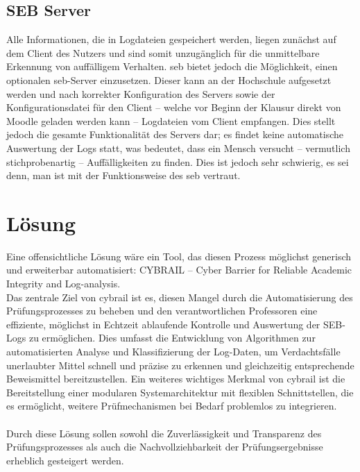 \subsection{SEB Server}
Alle Informationen, die in Logdateien gespeichert werden, liegen zunächst auf dem Client des Nutzers und sind somit unzugänglich für die unmittelbare Erkennung von auffälligem Verhalten. 
\gls{seb} bietet jedoch die Möglichkeit, einen optionalen \gls{seb}-Server einzusetzen. 
Dieser kann an der Hochschule aufgesetzt werden und nach korrekter Konfiguration des Servers sowie der Konfigurationsdatei für den Client – welche vor Beginn der Klausur direkt von Moodle geladen werden kann – Logdateien vom Client empfangen. 
Dies stellt jedoch die gesamte Funktionalität des Servers dar; 
es findet keine automatische Auswertung der Logs statt, was bedeutet, dass ein Mensch versucht – vermutlich stichprobenartig – Auffälligkeiten zu finden. 
Dies ist jedoch sehr schwierig, es sei denn, man ist mit der Funktionsweise des \gls{seb} vertraut.

\section{Lösung}
Eine offensichtliche Lösung wäre ein Tool, das diesen Prozess möglichst generisch und erweiterbar automatisiert: CYBRAIL – Cyber Barrier for Reliable Academic Integrity and Log-analysis.\\
Das zentrale Ziel von \gls{cybrail} ist es, diesen Mangel durch die Automatisierung des Prüfungsprozesses zu beheben und den verantwortlichen Professoren eine effiziente, möglichst in Echtzeit ablaufende Kontrolle und Auswertung der SEB-Logs zu ermöglichen. Dies umfasst die Entwicklung von Algorithmen zur automatisierten Analyse und Klassifizierung der Log-Daten, um Verdachtsfälle unerlaubter Mittel schnell und präzise zu erkennen und gleichzeitig entsprechende Beweismittel bereitzustellen. Ein weiteres wichtiges Merkmal von \gls{cybrail} ist die Bereitstellung einer modularen Systemarchitektur mit flexiblen Schnittstellen, die es ermöglicht, weitere Prüfmechanismen bei Bedarf problemlos zu integrieren.\\
\\
Durch diese Lösung sollen sowohl die Zuverlässigkeit und Transparenz des Prüfungsprozesses als auch die Nachvollziehbarkeit der Prüfungsergebnisse erheblich gesteigert werden.




